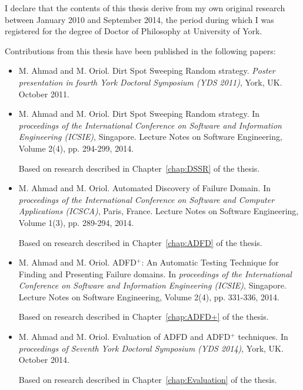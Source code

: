 \begin{declaration}

I declare that the contents of this thesis derive from my own original research between January 2010 and September 2014, the period during which I was registered for the degree of Doctor of Philosophy at University of York.

Contributions from this thesis have been published in the following papers: 

\begin{itemize}

\item M. Ahmad and M. Oriol. Dirt Spot Sweeping Random strategy. \textit{Poster presentation in fourth York Doctoral Symposium (YDS 2011)}, York, UK. October 2011.

\item M. Ahmad and M. Oriol. Dirt Spot Sweeping Random strategy. In \textit{proceedings of the International Conference on Software and Information Engineering (ICSIE)}, Singapore. Lecture Notes on Software Engineering, Volume 2(4), pp. 294-299, 2014.

Based on research described in Chapter~\ref{chap:DSSR} of the thesis.\\

\item M. Ahmad and M. Oriol. Automated Discovery of Failure Domain. In \textit{proceedings of the International Conference on Software and Computer Applications (ICSCA)}, Paris, France. Lecture Notes on Software Engineering, Volume 1(3), pp. 289-294, 2014.

Based on research described in Chapter~\ref{chap:ADFD} of the thesis.\\

\item M. Ahmad and M. Oriol. ADFD$^+$: An Automatic Testing Technique for Finding and Presenting Failure domains. In \textit{proceedings of the International Conference on Software and Information Engineering (ICSIE)}, Singapore. Lecture Notes on Software Engineering, Volume 2(4), pp. 331-336, 2014.

Based on research described in Chapter~\ref{chap:ADFD+} of the thesis.\\

\item M. Ahmad and M. Oriol. Evaluation of ADFD and ADFD$^+$ techniques. In \textit{proceedings of Seventh York Doctoral Symposium (YDS 2014)}, York, UK. October 2014. 

Based on research described in Chapter~\ref{chap:Evaluation} of the thesis.

\end{itemize}

\end{declaration}